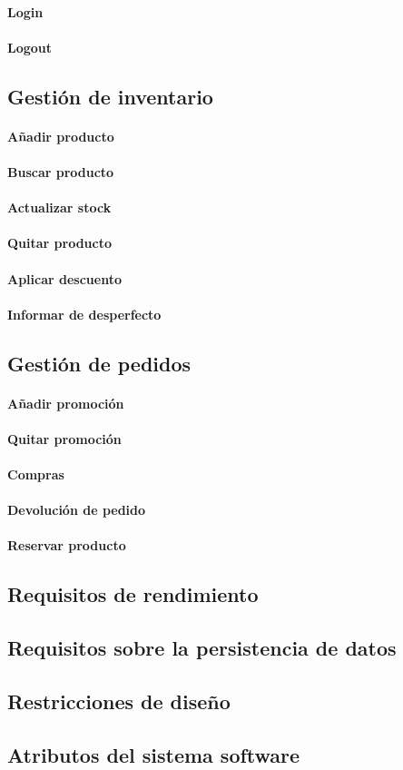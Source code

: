 \paragraph{Login}
\paragraph{Logout}
\subsection{Gestión de inventario}
\paragraph{Añadir producto}
\paragraph{Buscar producto}
\paragraph{Actualizar stock}
\paragraph{Quitar producto}
\paragraph{Aplicar descuento}
\paragraph{Informar de desperfecto}
\subsection{Gestión de pedidos}
\paragraph{Añadir promoción}
\paragraph{Quitar promoción}
\paragraph{Compras}
\paragraph{Devolución de pedido}
\paragraph{Reservar producto}
\subsection{Requisitos de rendimiento}
\subsection{Requisitos sobre la persistencia de datos}
\subsection{Restricciones de diseño}
\subsection{Atributos del sistema software}
